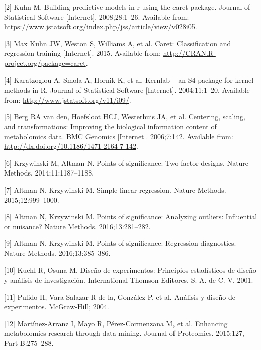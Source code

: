 \documentclass[12pt,spanish,a4paper]{article}
\numberwithin{equation}{section}
\begin{document}
\hypertarget{ref-JSSv028i05}{}
{[}2{]} Kuhn M. Building predictive models in r using the caret package.
Journal of Statistical Software {[}Internet{]}. 2008;28:1--26. Available
from:
\url{https://www.jstatsoft.org/index.php/jss/article/view/v028i05}.

\hypertarget{ref-caret2015}{}
{[}3{]} Max Kuhn JW, Weston S, Williams A, et al. Caret: Classification
and regression training {[}Internet{]}. 2015. Available from:
\url{http://CRAN.R-project.org/package=caret}.

\hypertarget{ref-kernlab2004}{}
{[}4{]} Karatzoglou A, Smola A, Hornik K, et al. Kernlab -- an S4
package for kernel methods in R. Journal of Statistical Software
{[}Internet{]}. 2004;11:1--20. Available from:
\url{http://www.jstatsoft.org/v11/i09/}.

\hypertarget{ref-vandenBerg2006}{}
{[}5{]} Berg RA van den, Hoefsloot HCJ, Westerhuis JA, et al. Centering,
scaling, and transformations: Improving the biological information
content of metabolomics data. BMC Genomics {[}Internet{]}. 2006;7:142.
Available from: \url{http://dx.doi.org/10.1186/1471-2164-7-142}.

\hypertarget{ref-krzywinskipostd2014}{}
{[}6{]} Krzywinski M, Altman N. Points of significance: Two-factor
designs. Nature Methods. 2014;11:1187--1188.

\hypertarget{ref-altmanslr2015}{}
{[}7{]} Altman N, Krzywinski M. Simple linear regression. Nature
Methods. 2015;12:999--1000.

\hypertarget{ref-altman2016a}{}
{[}8{]} Altman N, Krzywinski M. Points of significance: Analyzing
outliers: Influential or nuisance? Nature Methods. 2016;13:281--282.

\hypertarget{ref-altman2016b}{}
{[}9{]} Altman N, Krzywinski M. Points of significance: Regression
diagnostics. Nature Methods. 2016;13:385--386.

\hypertarget{ref-kuehl2001}{}
{[}10{]} Kuehl R, Osuna M. Diseño de experimentos: Principios
estadísticos de diseño y análisis de investigación. International
Thomson Editores, S. A. de C. V. 2001.

\hypertarget{ref-pulido2004}{}
{[}11{]} Pulido H, Vara Salazar R de la, González P, et al. Análisis y
diseño de experimentos. McGraw-Hill; 2004.

\hypertarget{ref-martinezarranz2015}{}
{[}12{]} Martínez-Arranz I, Mayo R, Pérez-Cormenzana M, et al. Enhancing
metabolomics research through data mining. Journal of Proteomics.
2015;127, Part B:275--288.
\end{document}
